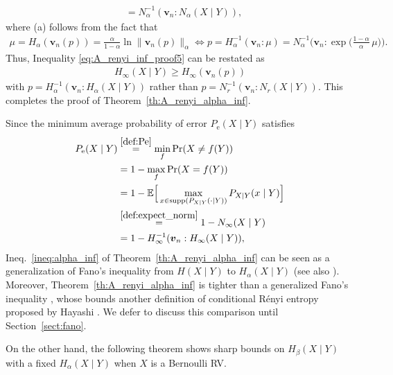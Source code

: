 \documentclass[conference, draftcls, onecolumn]{IEEEtran}
\theoremstyle{plain}
\newcommand{\bvec}[1]{\boldsymbol{#1}}
\newcommand{\supp}{\operatorname{supp}}
\newcommand{\thref}[1]{Theorem~\ref{#1}}
\newcommand{\sectref}[1]{Section~\ref{#1}}
\begin{document}
\begin{IEEEproof}[Proof of \thref{th:A_renyi_alpha_inf}]
\begin{align}
\\
& =
N_{\alpha}^{-1}( \bvec{v}_{n} : N_{\alpha}(X \mid Y) ) ,
\label{eq:A_renyi_2_proof4}
\end{align}
where (a) follows from the fact that
\begin{align}
\mu
=
H_{\alpha}( \bvec{v}_{n}( p ) )
=
\frac{ \alpha }{ 1 - \alpha } \ln \| \bvec{v}_{n}( p ) \|_{\alpha}
\iff
p
=
H_{\alpha}^{-1}( \bvec{v}_{n} : \mu )
=
N_{\alpha}^{-1}\bigg( \bvec{v}_{n} : \exp\Big( \frac{ 1 - \alpha }{ \alpha } \, \mu \Big) \bigg) .
\end{align}
Thus, Inequality \eqref{eq:A_renyi_inf_proof5} can be restated as
\begin{align}
H_{\infty}(X \mid Y)
\ge
H_{\infty}( \bvec{v}_{n}( p ) )
\end{align}
with $p = H_{\alpha}^{-1}( \bvec{v}_{n} : H_{\alpha}(X \mid Y))$ rather than $p = N_{r}^{-1}(\bvec{v}_{n} : N_{r}(X \mid Y) )$.
This completes the proof of \thref{th:A_renyi_alpha_inf}.
\end{IEEEproof}




Since the minimum average probability of error $P_{\mathrm{e}}(X \mid Y)$ satisfies 
\begin{align}
P_{\mathrm{e}}(X \mid Y)
& \overset{\eqref{def:Pe}}{=}
\min_{f} \Pr( X \neq f(Y) )
\\
& =
1 - \max_{f} \Pr( X = f(Y) )
\\
& =
1 - \mathbb{E} \Big[ \max_{x \in \supp(P_{X|Y}(\cdot \mid Y))} P_{X|Y}(x \mid Y) \Big]
\\
& \overset{\eqref{def:expect_norm}}{=}
1 - N_{\infty}(X \mid Y)
\\
& =
1 - H_{\infty}^{-1}( \bvec{v}_{n} : H_{\infty}(X \mid Y) ) ,
\end{align}
Ineq.~\eqref{ineq:alpha_inf} of \thref{th:A_renyi_alpha_inf} can be seen as a generalization of Fano's inequality from $H(X \mid Y)$ to $H_{\alpha}(X \mid Y)$ (see also \cite{sason}).
Moreover, \thref{th:A_renyi_alpha_inf} is tighter than a generalized Fano's inequality \cite[Theorem~7]{iwamoto}, whose bounds another definition of conditional R\'{e}nyi entropy proposed by Hayashi \cite{hayashi}.
We defer to discuss this comparison until \sectref{sect:fano}.



On the other hand, the following theorem shows sharp bounds on $H_{\beta}(X \mid Y)$ with a fixed $H_{\alpha}(X \mid Y)$ when $X$ is a Bernoulli RV.
\end{document}
